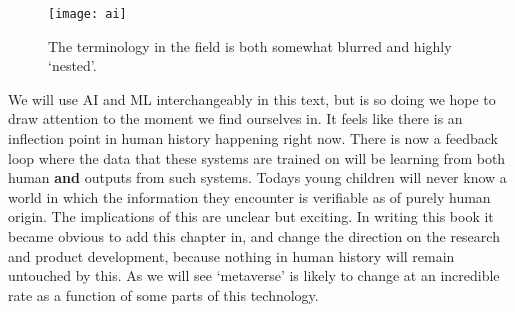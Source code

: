 \begin{figure}[ht]\centering 	\texttt{[image: ai]}
	\caption{The terminology in the field is both somewhat blurred and highly `nested'.}
	\label{fig:aiVenn}
\end{figure}

We will use AI and ML interchangeably in this text, but is so doing we hope to draw attention to the moment we find ourselves in. It feels like there is an inflection point in human history happening right now. There is now a feedback loop where the data that these systems are trained on will be learning from both human \textbf{and} outputs from such systems. Todays young children will never know a world in which the information they encounter is verifiable as of purely human origin. The implications of this are unclear but exciting. In writing this book it became obvious to add this chapter in, and change the direction on the research and product development, because nothing in human history will remain untouched by this. As we will see `metaverse' is likely to change at an incredible rate as a function of some parts of this technology.\par 
